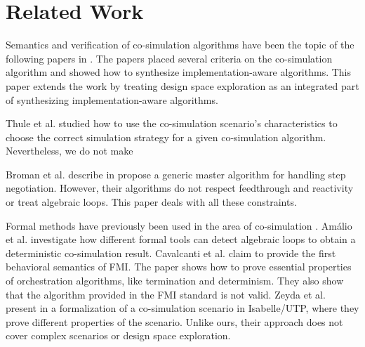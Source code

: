 \section{Related Work}\label{sc:related}
Semantics and verification of co-simulation algorithms have been the topic of the following papers in \cite{Gomes2019c,Gomes2019a,Broman2013,thrane2021}. 
The papers \cite{Gomes2019c,thrane2021} placed several criteria on the co-simulation algorithm and showed how to synthesize implementation-aware algorithms.
This paper extends the work by treating design space exploration as an integrated part of synthesizing implementation-aware algorithms. 

Thule et al. \cite{Thule_2018} studied how to use the co-simulation scenario's characteristics to choose the correct simulation strategy for a given co-simulation algorithm. 
Nevertheless, we do not make 

Broman et al. describe in \cite{Broman2013} propose a generic master algorithm for handling step negotiation. 
However, their algorithms do not respect feedthrough and reactivity or treat algebraic loops. 
This paper deals with all these constraints.

Formal methods have previously been used in the area of co-simulation \cite{Amalio2016,sampaio_behavioural_2016,cerone_formalising_2018,hansen_verification_2021}.
Amálio et al. \cite{Amalio2016} investigate how different formal tools can detect algebraic loops to obtain a deterministic co-simulation result. 
Cavalcanti et al. \cite{sampaio_behavioural_2016} claim to provide the first behavioral semantics of FMI. 
The paper shows how to prove essential properties of orchestration algorithms, like termination and determinism. 
They also show that the algorithm provided in the FMI standard is not valid. 
Zeyda et al. present in \cite{cerone_formalising_2018}  a formalization of a co-simulation scenario in Isabelle/UTP, where they prove different properties of the scenario.
Unlike ours, their approach does not cover complex scenarios or design space exploration.